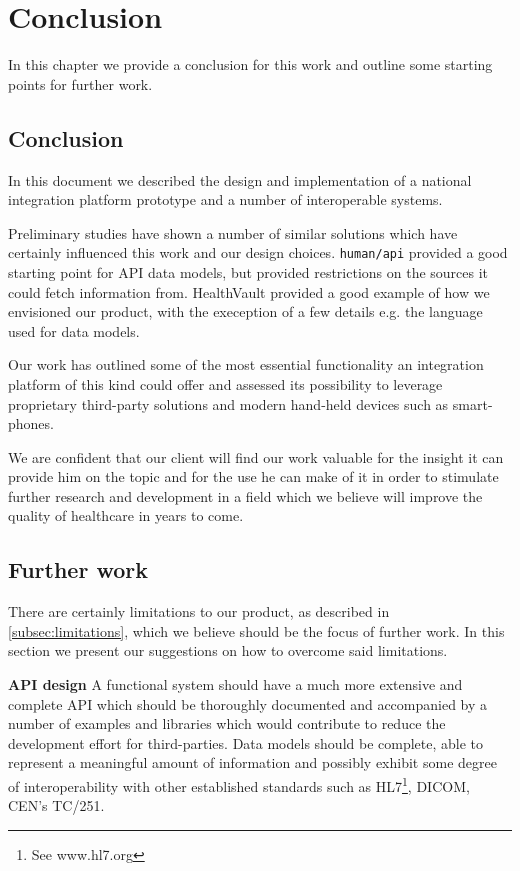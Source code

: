 \chapter{Conclusion}
\label{ch:conclusion}

In this chapter we provide a conclusion for this work and outline some
starting points for further work.

\section{Conclusion}

In this document we described the design and implementation of a national integration
platform prototype and a number of interoperable systems.

Preliminary studies have shown a number of similar solutions which have certainly influenced
this work and our design choices. \verb|human/api| provided a good starting point for API data models,
but provided restrictions on the sources it could fetch information from.
HealthVault provided a good example of how we envisioned our product, with the exeception
of a few details e.g. the language used for data models.

Our work has outlined some of the most essential functionality an integration platform
of this kind could offer and assessed its possibility to leverage proprietary
third-party solutions and modern hand-held devices such as smart-phones.

We are confident that our client will find our work valuable for the insight it can provide
him on the topic and for the use he can make of it in order to stimulate further research
and development in a field which we believe will improve the quality of healthcare in years to come.

\section{Further work}

There are certainly limitations to our product, as described in \ref{subsec:limitations}, which we believe should be
the focus of further work. In this section we present our suggestions on how to overcome said limitations.

\textbf{API design}\newline
A functional system should have a much more extensive and complete API which should be
thoroughly documented and accompanied by a number of examples and libraries which
would contribute to reduce the development effort for third-parties.
Data models should be complete, able to represent a meaningful amount of information
and possibly exhibit some degree of interoperability with other established standards
such as HL7\footnote{See www.hl7.org}, DICOM, CEN's TC/251.


